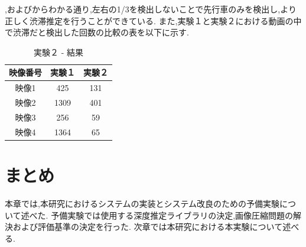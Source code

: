 ,およびからわかる通り,左右の1/3を検出しないことで先行車のみを検出し,より正しく渋滞推定を行うことができている.
また,実験１と実験２における動画の中で渋滞だと検出した回数の比較の表を以下に示す.

\begin{table}[htbp]
  \centering
  \begin{scriptsize}
  \begin{tabular}{ccc}
  \toprule
映像番号 & 実験１ & 実験２\\
  \midrule
映像1 & 425 & 131\\
映像2 & 1309 & 401\\
映像3 & 256 & 59\\
映像4 & 1364 & 65\\
  \bottomrule
  \end{tabular}
  \end{scriptsize}
  \caption{実験２ - 結果}
  \label{tab:dataset}
\end{table}

\section{まとめ}
本章では,本研究におけるシステムの実装とシステム改良のための予備実験について述べた.
予備実験では使用する深度推定ライブラリの決定,画像圧縮問題の解決および評価基準の決定を行った.
次章では本研究における本実験について述べる.